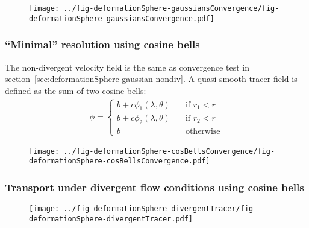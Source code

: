 \begin{figure}
	\centering
	\texttt{[image: ../fig-deformationSphere-gaussiansConvergence/fig-deformationSphere-gaussiansConvergence.pdf]}
	\caption{}
\end{figure}

\subsubsection{``Minimal'' resolution using cosine bells}

The non-divergent velocity field is the same as convergence test in section~\ref{sec:deformationSphere-gaussian-nondiv}.  A quasi-smooth tracer field is defined as the sum of two cosine bells:
\begin{align}
	\phi =
	\begin{cases}
		b + c \phi_1(\lambda, \theta) & \quad \text{if $r_1 < r$} \\
		b + c \phi_2(\lambda, \theta) & \quad \text{if $r_2 < r$} \\
		b			      & \quad \text{otherwise}
	\end{cases}
\end{align}

\begin{figure}
	\centering
	\texttt{[image: ../fig-deformationSphere-cosBellsConvergence/fig-deformationSphere-cosBellsConvergence.pdf]}
	\caption{}
\end{figure}

\subsubsection{Transport under divergent flow conditions using cosine bells}

\begin{figure}
	\centering
	\texttt{[image: ../fig-deformationSphere-divergentTracer/fig-deformationSphere-divergentTracer.pdf]}
	\caption{}
\end{figure}

